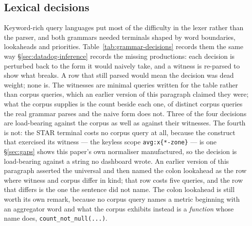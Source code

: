 \subsection{Lexical decisions}

Keyword-rich query languages put most of the difficulty in the lexer rather than the
parser, and both grammars needed terminals shaped by word boundaries, lookaheads and
priorities. Table~\ref{tab:grammar-decisions} records them the same way
\S\ref{sec:datadog-inference} records the missing productions: each decision is
perturbed back to the form it would naively take, and a witness is re-parsed to show
what breaks. A row that still parsed would mean the decision was dead weight; none is.
The witnesses are minimal queries written for the table rather than corpus queries, which
an earlier version of this paragraph claimed they were; what the corpus supplies is the
count beside each one, of distinct corpus queries the real grammar parses and the naive
form does not. Three of the four decisions are load-bearing against the corpus as well as against
their witnesses. The fourth is not: the STAR terminal costs no corpus query at all,
because the construct that exercised its witness --- the keyless scope
\texttt{avg:x\{*-zone\}} --- is one \S\ref{sec:gaps} shows this paper's own normaliser
manufactured, so the decision is load-bearing against a string no dashboard wrote. An
earlier version of this paragraph asserted the universal and then named the colon
lookahead as the row where witness and corpus differ in kind; that row costs five
queries, and the row that differs is the one the sentence did not name. The colon
lookahead is still worth its own remark, because no corpus query names a metric
beginning with an aggregator word and what the corpus exhibits instead is a
\emph{function} whose name does, \texttt{count\_not\_null(...)}.

\begin{table}[htbp]\centering\scriptsize

\caption{Load-bearing lexical decisions. Each row perturbs one terminal to its naive
form and re-parses the witness, which the real grammar accepts. The witnesses are
minimal queries written for this table; the last column is how many distinct corpus
queries the naive form stops parsing.}
\label{tab:grammar-decisions}
\end{table}


